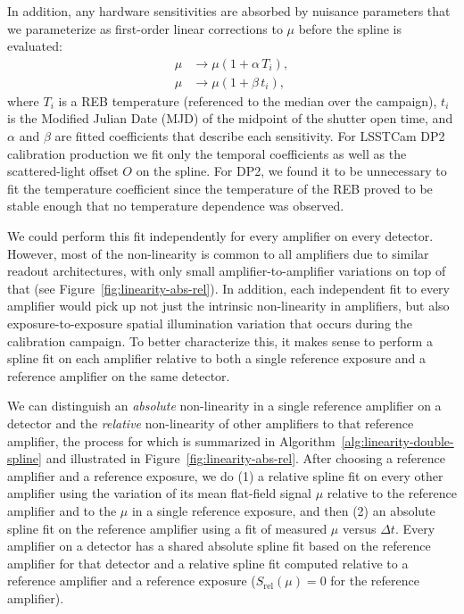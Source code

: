 In addition, any hardware sensitivities are absorbed by nuisance parameters that we parameterize as first-order linear corrections to $\mu$ before the spline is evaluated:
\begin{equation}
\begin{aligned}
    \mu &\rightarrow \mu \left(1 + \alpha\, T_i\right), \\
    \mu &\rightarrow \mu \left(1 + \beta\, t_i\right),
\end{aligned}
\label{eq:linearity-nuisance}
\end{equation}
where $T_i$ is a REB temperature (referenced to the median over the campaign), $t_i$ is the Modified Julian Date (MJD) of the midpoint of the shutter open time, and $\alpha$ and $\beta$ are fitted coefficients that describe each sensitivity.
For LSSTCam DP2 calibration production we fit only the temporal coefficients as well as the scattered-light offset $O$ on the spline.
For DP2, we found it to be unnecessary to fit the temperature coefficient since the temperature of the REB proved to be stable enough that no temperature dependence was observed.

We could perform this fit independently for every amplifier on every detector. However, most of the non-linearity is common to all amplifiers due to similar readout architectures, with only small amplifier-to-amplifier variations on top of that (see Figure~\ref{fig:linearity-abs-rel}).
In addition, each independent fit to every amplifier would pick up not just the intrinsic non-linearity in amplifiers, but also exposure-to-exposure spatial illumination variation that occurs during the calibration campaign.
To better characterize this, it makes sense to perform a spline fit on each amplifier relative to both a single reference exposure and a reference amplifier on the same detector.

We can distinguish an \emph{absolute} non-linearity in a single reference amplifier on a detector and the \emph{relative} non-linearity of other amplifiers to that reference amplifier, the process for which is summarized in Algorithm~\ref{alg:linearity-double-spline} and illustrated in Figure~\ref{fig:linearity-abs-rel}.
After choosing a reference amplifier and a reference exposure, we do (1) a relative spline fit on every other amplifier using the variation of its mean flat-field signal $\mu$ relative to the reference amplifier and to the $\mu$ in a single reference exposure, and then (2)
an absolute spline fit on the reference amplifier using a fit of measured $\mu$ versus $\Delta t$.
Every amplifier on a detector has a shared absolute spline fit based on the reference amplifier for that detector and a relative spline fit computed relative to a reference amplifier and a reference exposure ($S_{\mathrm{rel}}(\mu) = 0$ for the reference amplifier).

